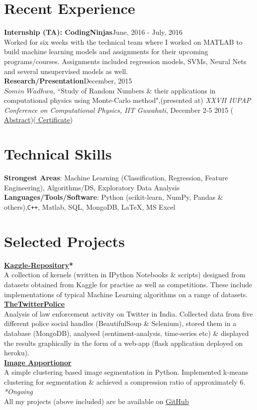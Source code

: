 \documentclass[margin,line]{res}
\begin{document}
\begin{resume}
\section{\sc Recent Experience}
{\bf Internship (TA): CodingNinjas}\hfill June, 2016 - July, 2016\\  
Worked for six weeks with the technical team where I worked on MATLAB to build machine learning models and assignments for 
their upcoming programs/courses. Assignments included regression models, SVMs, Neural Nets and several unsupervised models as well.\\
{\bf Research/Presentation}\hfill December, 2015\\  
\(Somin\) \(Wadhwa\), ``Study of Random Numbers \& their applications in computational physics using Monte-Carlo method",(presented at) {\em  XXVII IUPAP Conference on Computational Physics, IIT Guwahati}, December 2-5 2015 ({\href{https://drive.google.com/open?id=0B8hsJozmBILETlV3VVQ3S21NLTg}{\color{blue} Abstract}})({\href{https://drive.google.com/open?id=0B8hsJozmBILEcGRiT2VzZ0hFUEE}{\color{blue} Certificate}})

\section{\sc Technical Skills}
{\bf Strongest Areas}: Machine Learning (Classification, Regression, Feature Engineering), Algorithms/DS, Exploratory Data Analysis\\
{\bf Languages/Tools/Software}: Python (scikit-learn, NumPy, Pandas \& others),\texttt{C++}, Matlab, SQL, MongoDB, \LaTeX, MS Excel

\section{\sc Selected Projects}
{\bf {\href{https://github.com/sominwadhwa/Kaggle}{\color{blue} Kaggle-Repository}*}}\\
A collection of kernels (written in IPython Notebooks \& scripts) designed from datasets obtained from Kaggle for practise as well as competitions. These include implementations of typical Machine Learning algorithms on a range of datasets.\\
{\bf {\href{https://github.com/sominwadhwa/TheTwitterPolice}{\color{blue} TheTwitterPolice}}}\\
Analysis of law enforcement activity on Twitter in India. Collected data from five different police social handles (BeautifulSoup \& Selenium), stored them in a database (MongoDB), analysed (sentiment-analysis, time-series etc) \& displayed the results graphically in the form of a web-app (flask application deployed on heroku).\\
{\bf {\href{https://github.com/sominwadhwa/Image-Apportionor}{\color{blue} Image Apportionor}}}\\
A simple clustering based image segmentation in Python. Implemented k-means clustering for segmentation \& achieved a compression ratio of approximately 6.\\
\textit{*Ongoing}\\
All my projects (above included) are be available on {\href{https://github.com/sominwadhwa}{\color{blue}GitHub}}


\end{resume}
\end{document}
